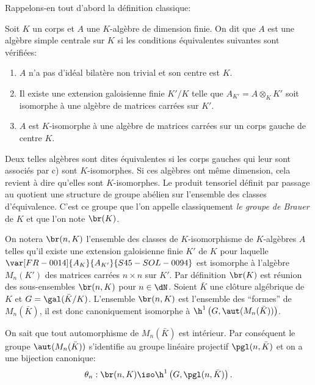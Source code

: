 Rappelons-en tout d'abord la définition classique:





\begin{definitiondotdash}\label{I:3-1-1}
Soit $K$ un corps et $A$ une $K$-algèbre de dimension finie. On dit que $A$ 
est une algèbre simple centrale sur $K$ si les conditions équivalentes 
suivantes sont vérifiées:
\begin{enumerate}[\indent a)]
  \item $A$ n'a pas d'idéal bilatère non trivial et son centre est $K$. 
  \item Il existe une extension galoisienne finie $K'/K$ telle que 
    $A_{K'} = A\otimes_K K'$ soit isomorphe à une algèbre de matrices 
    carrées sur $K'$.
  \item $A$ est $K$-isomorphe à une algèbre de matrices carrées sur un corps 
    gauche de centre $K$.
\end{enumerate}
\end{definitiondotdash}

Deux telles algèbres sont dites équivalentes si les corps gauches qui 
leur sont associés par c) sont $K$-isomorphes. Si ces algèbres ont 
même dimension, cela revient à dire qu'elles sont $K$-isomorphes. Le 
produit tensoriel définit par passage au quotient une structure de groupe 
abélien sur l'ensemble des classes d'équivalence. C'est ce groupe que l'on 
appelle classiquement \emph{le groupe de Brauer} de $K$ et que l'on note 
$\br(K)$. 





\begin{sourceinline}\label{I:3-1-2}
On notera $\br(n,K)$ l'ensemble des classes de $K$-isomorphisme de 
$K$-algèbres $A$ telles qu'il existe une extension galoisienne finie $K'$ de 
$K$ pour laquelle $\var[FR-0014]{A_K}{A_{K'}}{S45-SOL-0094}$ est isomorphe à l'algèbre $M_n(K')$ des matrices 
carrées $n\times n$ sur $K'$. Par définition $\br(K)$ est réunion des 
sous-ensembles $\br(n,K)$ pour $n\in\dN$. Soient $\bar K$ une clôture 
algébrique de $K$ et $G=\gal(\bar K/K)$. L'ensemble $\br(n,K)$ est 
l'ensemble des ``formes'' de $M_n(\bar K)$, il est donc canoniquement 
isomorphe à $\h^1\left(G,\aut(M_n(\bar K))\right)$. 
\end{sourceinline}

On sait que tout automorphisme de $M_n(\bar K)$ est intérieur. Par 
conséquent le groupe $\aut(M_n(\bar K))$ s'identifie au groupe linéaire 
projectif $\pgl(n,\bar K)$ et on a une bijection canonique:
\[
  \theta_n : \br(n,K) \iso \h^1\left(G,\pgl(n,\bar K)\right)\text{.}
\]

